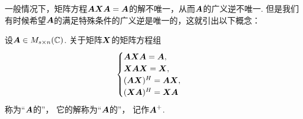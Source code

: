 一般情况下，矩阵方程\(\boldsymbol{A} \boldsymbol{X} \boldsymbol{A} = \boldsymbol{A}\)的解不唯一，从而\(\boldsymbol{A}\)的广义逆不唯一.
但是我们有时候希望\(\boldsymbol{A}\)的满足特殊条件的广义逆是唯一的，这就引出以下概念：
\begin{definition}
设\(\boldsymbol{A} \in M_{s \times n}(\mathbb{C})\).
关于矩阵\(\boldsymbol{X}\)的矩阵方程组\begin{equation}\label{equation:线性方程组.彭罗斯方程组}
	\begin{cases}
		\boldsymbol{A} \boldsymbol{X} \boldsymbol{A} = \boldsymbol{A}, \\
		\boldsymbol{X} \boldsymbol{A} \boldsymbol{X} = \boldsymbol{X}, \\
		(\boldsymbol{A} \boldsymbol{X})^H = \boldsymbol{A} \boldsymbol{X}, \\
		(\boldsymbol{X} \boldsymbol{A})^H = \boldsymbol{X} \boldsymbol{A}
	\end{cases}
\end{equation}
称为“\(\boldsymbol{A}\)的”，
它的解称为“\(\boldsymbol{A}\)的”，
记作\(\boldsymbol{A}^+\).
\end{definition}

